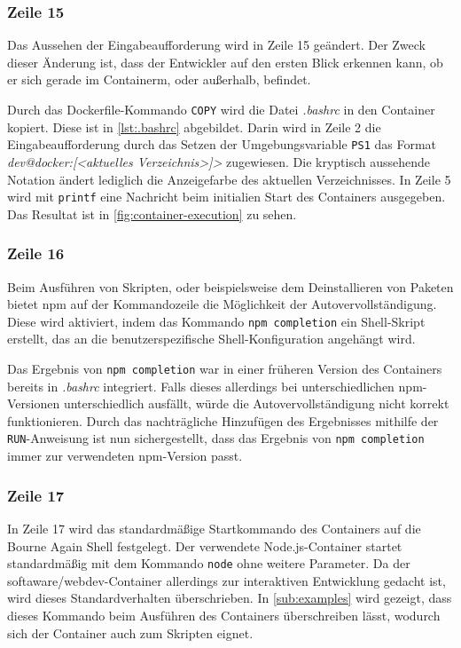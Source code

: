 \subsubsection {Zeile 15}
Das Aussehen der Eingabeaufforderung wird in Zeile 15 geändert.
Der Zweck dieser Änderung ist, dass der Entwickler auf den ersten Blick erkennen kann, ob er sich gerade im Containerm, oder außerhalb, befindet.

Durch das Dockerfile-Kommando \verb|COPY| wird die Datei \emph{.bashrc} in den Container kopiert.
Diese ist in \cref{lst:.bashrc} abgebildet.
Darin wird in Zeile 2 die Eingabeaufforderung durch das Setzen der Umgebungsvariable \verb|PS1| das Format \emph{dev@docker:[<aktuelles Verzeichnis>]>} zugewiesen.
Die kryptisch aussehende Notation ändert lediglich die Anzeigefarbe des aktuellen Verzeichnisses.
In Zeile 5 wird mit \verb|printf| eine Nachricht beim initialien Start des Containers ausgegeben.
Das Resultat ist in \cref{fig:container-execution} zu sehen.

\subsubsection {Zeile 16}
Beim Ausführen von Skripten, oder beispielsweise dem Deinstallieren von Paketen bietet npm auf der Kommandozeile die Möglichkeit der Autovervollständigung.
Diese wird aktiviert, indem das Kommando \verb|npm completion| ein Shell-Skript erstellt, das an die benutzerspezifische Shell-Konfiguration angehängt wird.

Das Ergebnis von \verb|npm completion| war in einer früheren Version des Containers bereits in \emph{.bashrc} integriert.
Falls dieses allerdings bei unterschiedlichen npm-Versionen unterschiedlich ausfällt, würde die Autovervollständigung nicht korrekt funktionieren.
Durch das nachträgliche Hinzufügen des Ergebnisses mithilfe der \verb|RUN|-Anweisung ist nun sichergestellt, dass das Ergebnis von \verb|npm completion| immer zur verwendeten npm-Version passt.

\subsubsection {Zeile 17}
In Zeile 17 wird das standardmäßige Startkommando des Containers auf die Bourne Again Shell festgelegt.
Der verwendete Node.js-Container startet standardmäßig mit dem Kommando \verb|node| ohne weitere Parameter.
Da der softaware/webdev-Container allerdings zur interaktiven Entwicklung gedacht ist, wird dieses Standardverhalten überschrieben.
In \cref{sub:examples} wird gezeigt, dass dieses Kommando beim Ausführen des Containers überschreiben lässt, wodurch sich der Container auch zum Skripten eignet.


